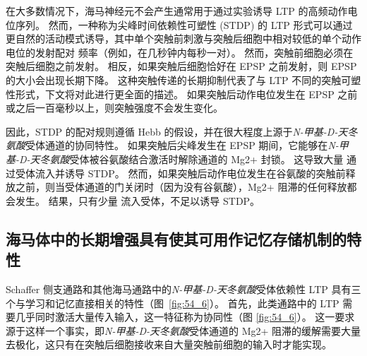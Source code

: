 在大多数情况下，海马神经元不会产生通常用于通过实验诱导 LTP 的高频动作电位序列。
然而，一种称为尖峰时间依赖性可塑性 (STDP) 的 LTP 形式可以通过更自然的活动模式诱导，其中单个突触前刺激与突触后细胞中相对较低的单个动作电位的发射配对 频率（例如，在几秒钟内每秒一对）。
然而，突触前细胞必须在突触后细胞之前发射。 相反，如果突触后细胞恰好在 EPSP 之前发射，则 EPSP 的大小会出现长期下降。
这种突触传递的长期抑制代表了与 LTP 不同的突触可塑性形式，下文将对此进行更全面的描述。
如果突触后动作电位发生在 EPSP 之前或之后一百毫秒以上，则突触强度不会发生变化。


因此，STDP 的配对规则遵循 Hebb 的假设，并在很大程度上源于\textit{N-甲基-D-天冬氨酸}受体通道的协同特性。
如果突触后尖峰发生在 EPSP 期间，它能够在\textit{N-甲基-D-天冬氨酸}受体被谷氨酸结合激活时解除通道的 Mg2+ 封锁。
这导致大量  通过受体流入并诱导 STDP。
然而，如果突触后动作电位发生在谷氨酸的突触前释放之前，则当受体通道的门关闭时（因为没有谷氨酸），Mg2+ 阻滞的任何释放都会发生。
结果，只有少量  流入受体，不足以诱导 STDP。



\subsection{海马体中的长期增强具有使其可用作记忆存储机制的特性}

Schaffer 侧支通路和其他海马通路中的\textit{N-甲基-D-天冬氨酸}受体依赖性 LTP 具有三个与学习和记忆直接相关的特性（图~\ref{fig:54_6}）。
首先，此类通路中的 LTP 需要几乎同时激活大量传入输入，这一特征称为协同性（图 \ref{fig:54_6}）。
这一要求源于这样一个事实，即\textit{N-甲基-D-天冬氨酸}受体通道的 Mg2+ 阻滞的缓解需要大量去极化，这只有在突触后细胞接收来自大量突触前细胞的输入时才能实现。


